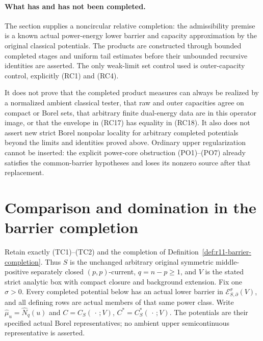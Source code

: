 \documentclass[11pt,a4paper]{article}
\numberwithin{equation}{section}
\theoremstyle{definition}
\theoremstyle{remark}
\begin{document}
\paragraph{What has and has not been completed.}
The section supplies a noncircular relative completion:
the admissibility premise is a known actual power-energy
lower barrier and capacity approximation by the original
classical potentials. The products are constructed through
bounded completed stages and uniform tail estimates before
their unbounded recursive identities are asserted.
The only weak-limit set control used is outer-capacity
control, explicitly (RC1) and (RC4).

It does not prove that the completed product measures can
always be realized by a normalized ambient classical tester,
that raw and outer capacities agree on compact or Borel sets,
that arbitrary finite dual-energy data are in this operator
image, or that the envelope in (RC17) has equality in (RC18).
It also does not assert new strict Borel nonpolar locality
for arbitrary completed potentials beyond the limits and
identities proved above. Ordinary upper regularization cannot
be inserted: the explicit power-core obstruction (PO1)--(PO7)
already satisfies the common-barrier hypotheses and loses its
nonzero source after that replacement.



\section{Comparison and domination in the barrier completion}
\label{sec:r11-completed-comparison-domination}

Retain exactly (TC1)--(TC2) and the completion
of Definition~\ref{def:r11-barrier-completion}. Thus $S$ is the
unchanged arbitrary original symmetric middle-positive separately
closed $(p,p)$-current, $q=n-p\geq1$, and $V$ is the stated
strict analytic box with compact closure and background extension.
Fix one $\sigma>0$. Every completed potential below has an actual
lower barrier in $\mathcal E^\sigma_{S,\partial}(V)$, and all
defining rows are actual members of that same power class.
Write $\widehat\mu_u=\widehat N_q(u)$ and
$C=C_S(\,\cdot\,;V)$, $C^*=C_S^*(\,\cdot\,;V)$.
The potentials are their specified actual Borel representatives;
no ambient upper semicontinuous representative is asserted.
\end{document}
